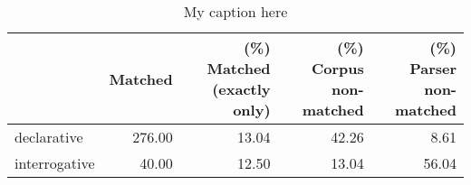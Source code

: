 \begin{table}[!ht]
\centering
\begin{tabular}{lrrrr}
\toprule
{} &  Matched &  (\%) Matched (exactly only) &  (\%) Corpus non-matched &  (\%) Parser non-matched \\
\midrule
declarative   &   276.00 &                       13.04 &                   42.26 &                    8.61 \\
interrogative &    40.00 &                       12.50 &                   13.04 &                   56.04 \\
\bottomrule
\end{tabular}
\caption{My caption here}
\label{tab:INDICATIVE-ocd-relative}
\end{table}